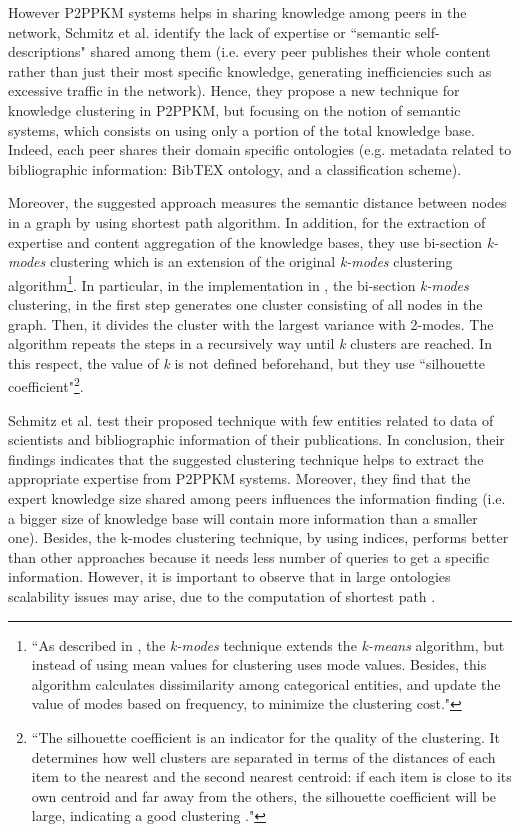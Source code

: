 \documentclass[runningheads]{llncs}
\begin{document}
However P2PPKM systems helps in sharing knowledge among peers in the network, Schmitz et al. \cite{Schmitz} identify the lack of expertise or ``semantic self-descriptions" shared among them (i.e. every peer publishes their whole content rather than just their most specific knowledge, generating inefficiencies such as excessive traffic in the network). Hence, they propose a new technique for knowledge clustering in P2PPKM, but focusing on the notion of semantic systems, which consists on using only a portion of the total knowledge base. Indeed, each peer shares their domain specific ontologies (e.g. metadata related to bibliographic information: BibTEX ontology, and a classification scheme). 

Moreover, the suggested approach measures the semantic distance between nodes in a graph by using shortest path algorithm. In addition, for the extraction of expertise and content aggregation of the knowledge bases, they use bi-section {\textit{k-modes}} clustering which is an extension of the original {\textit{k-modes}} clustering algorithm\footnote{``As described in \cite{Huang}, the {\textit{k-modes}} technique extends the {\textit{k-means}} algorithm, but instead of using mean values for clustering uses mode values. Besides, this algorithm calculates dissimilarity among categorical entities, and update the value of modes based on frequency, to minimize the clustering cost."}. In particular, in the implementation in \cite{Schmitz}, the bi-section {\textit{k-modes}} clustering, in the first step generates one cluster consisting of all nodes in the graph. Then, it divides the cluster with the largest variance with 2-modes. The algorithm repeats the steps in a recursively way until {\textit{k}} clusters are reached. In this respect, the value of {\textit{k}} is not defined beforehand, but they use ``silhouette coefficient"\footnote{``The silhouette coefficient is an indicator for the quality of the clustering. It determines how well clusters are separated in terms of the distances of each item to the nearest and the second nearest centroid: if each item is close to its own centroid and far away from the others, the silhouette coefficient will be large, indicating a good clustering \cite{Schmitz}."}.

Schmitz et al. \cite{Schmitz} test their proposed technique with few entities related to data of scientists and bibliographic information of their publications. In conclusion, their findings indicates that the suggested clustering technique helps to extract the appropriate expertise from P2PPKM systems. Moreover, they find that the expert knowledge size shared among peers influences the information finding (i.e. a bigger size of knowledge base will contain more information than a smaller one). Besides, the k-modes clustering technique, by using indices, performs better than other approaches because it needs less number of queries to get a specific information. 
However, it is important to observe that in large ontologies scalability issues may arise, due to the computation of shortest path \cite{Schmitz}.
\end{document}
